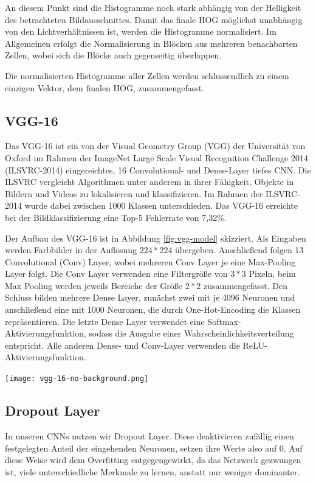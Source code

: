 \documentclass[11pt,a4paper]{article}
\begin{document}
An diesem Punkt sind die Histogramme noch stark abhängig von der Helligkeit des betrachteten Bildausschnittes. Damit das finale HOG möglichst unabhängig von den Lichtverhältnissen ist, werden die Histogramme normalisiert. Im Allgemeinen erfolgt die Normalisierung in Blöcken aus mehreren benachbarten Zellen, wobei sich die Blöcke auch gegenseitig überlappen.

Die normalisierten Histogramme aller Zellen werden schlussendlich zu einem einzigen Vektor, dem finalen HOG, zusammengefasst. \cite{Dalal}\cite{ocv_hog}

\subsection{VGG-16}
\label{subsec:VGG_Basics}
Das VGG-16 ist ein von der Visual Geometry Group (VGG) der Universität von Oxford im Rahmen der ImageNet Large Scale Visual Recognition Challenge 2014 (ILSVRC-2014) eingereichtes, 16 Convolutional- und Dense-Layer tiefes CNN. Die ILSVRC vergleicht Algorithmen unter anderem in ihrer Fähigkeit, Objekte in Bildern und Videos zu lokalisieren und klassifizieren. Im Rahmen der ILSVRC-2014 wurde dabei zwischen 1000 Klassen unterschieden. Das VGG-16 erreichte bei der Bildklassifizierung eine Top-5 Fehlerrate von 7,32\%. \cite{ImageNet2014}

Der Aufbau des VGG-16 ist in Abbildung \ref{fig:vgg-model} skizziert. Als Eingaben werden Farbbilder in der Auflösung $224 * 224$ übergeben. Anschließend folgen 13 Convolutional (Conv) Layer, wobei mehreren Conv Layer je eine Max-Pooling Layer folgt. Die Conv Layer verwenden eine Filtergröße von $3 * 3$ Pixeln, beim Max Pooling werden jeweils Bereiche der Größe $2 * 2$ zusammengefasst. Den Schluss bilden mehrere Dense Layer, zunächst zwei mit je 4096 Neuronen und anschließend eine mit 1000 Neuronen, die durch One-Hot-Encoding die Klassen repräsentieren. Die letzte Dense Layer verwendet eine Softmax-Aktivierungsfunktion, sodass die Ausgabe einer Wahrscheinlichkeitsverteilung entspricht. Alle anderen Dense- und Conv-Layer verwenden die ReLU-Aktivierungsfunktion. \cite{VGG16_Paper}

\begin{minipage}{.9\linewidth}
	\texttt{[image: vgg-16-no-background.png]}
	\label{fig:vgg-model}
\end{minipage}

\subsection{Dropout Layer}
In unseren CNNs nutzen wir Dropout Layer. Diese deaktivieren zufällig einen festgelegten Anteil der eingehenden Neuronen, setzen ihre Werte also auf 0. Auf diese Weise wird dem Overfitting entgegengewirkt, da das Netzwerk gezwungen ist, viele unterschiedliche Merkmale zu lernen, anstatt nur weniger dominanter.
\end{document}
